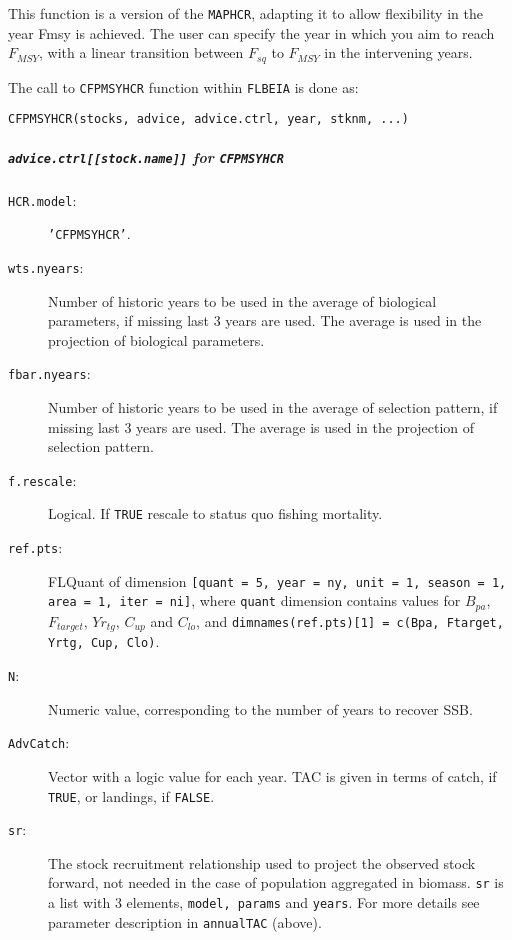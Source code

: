   This function is a version of the \texttt{MAPHCR}, adapting it to allow flexibility in the year Fmsy is achieved. 
  The user can specify the year in which you aim to reach $F_{MSY}$, with a linear transition between $F_{sq}$ to $F_{MSY}$ in the intervening years.

  The call to \texttt{CFPMSYHCR} function within \texttt{FLBEIA} is done as:

	\begin{center}
		\texttt{CFPMSYHCR(stocks, advice, advice.ctrl, year, stknm, ...)}
	\end{center}

	\subparagraph{\texttt{advice.ctrl[[stock.name]]} for \texttt{CFPMSYHCR}}

	  \begin{description}
	    \item[\texttt{HCR.model}:] \texttt{'CFPMSYHCR'}.
		  \item[\texttt{wts.nyears}:] Number of historic years to be used in the average of biological parameters, if missing last 3 years are used. The average is used in the projection of biological parameters.
		  \item[\texttt{fbar.nyears}:] Number of historic years to be used in the average of selection pattern, if missing last 3 years are used. The average is used in the projection of selection pattern.
		  \item[\texttt{f.rescale}:] Logical.  If \texttt{TRUE} rescale to status quo fishing mortality.
		  \item[\texttt{ref.pts}:] FLQuant of dimension \texttt{[quant = 5, year = ny, unit = 1, season = 1, area = 1, iter = ni]}, 
		    where \texttt{quant} dimension contains values for $B_{pa}$, $F_{target}$, $Yr_{tg}$, $C_{up}$ and $C_{lo}$, 
		    and \texttt{dimnames(ref.pts)[1] = c(Bpa, Ftarget, Yrtg, Cup, Clo)}.
		    
		  \item[\texttt{N}:]  Numeric value, corresponding to the number of years to recover SSB.
		  \item[\texttt{AdvCatch}:] Vector with a logic value for each year. TAC is given in terms of catch, if \texttt{TRUE}, or landings, if \texttt{FALSE}.
		  \item[\texttt{sr}:] The stock recruitment relationship used to project the observed stock forward, not needed in the case of population aggregated in biomass. \texttt{sr} is a list with 3 elements, \texttt{model, params} and \texttt{years}. For more details see parameter description in \texttt{annualTAC} (above).
	\end{description}  
  



